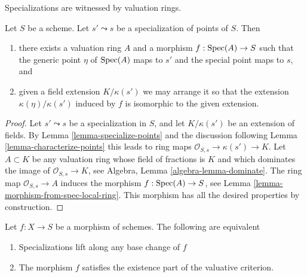 \begin{lemma}
\label{lemma-points-specialize}
\begin{slogan}
Specializations are witnessed by valuation rings.
\end{slogan}
Let $S$ be a scheme. Let $s' \leadsto s$ be a specialization of points of $S$.
Then
\begin{enumerate}
\item there exists a valuation ring $A$ and a morphism
$f : \mathop{\mathrm{Spec}}(A) \to S$ such that the generic point $\eta$ of
$\mathop{\mathrm{Spec}}(A)$ maps to $s'$ and the special point maps to $s$, and
\item given a field extension $K/\kappa(s')$
we may arrange it so that the extension
$\kappa(\eta)/\kappa(s')$ induced by $f$
is isomorphic to the given extension.
\end{enumerate}
\end{lemma}

\begin{proof}
Let $s' \leadsto s$ be a specialization in $S$, and let
$K/\kappa(s')$ be an extension of fields. By
Lemma \ref{lemma-specialize-points}
and the discussion following
Lemma \ref{lemma-characterize-points}
this leads to ring maps $\mathcal{O}_{S, s} \to \kappa(s') \to K$.
Let $A \subset K$ be any valuation ring whose field of fractions is
$K$ and which dominates the image of $\mathcal{O}_{S, s} \to K$, see
Algebra, Lemma \ref{algebra-lemma-dominate}.
The ring map $\mathcal{O}_{S, s} \to A$ induces the morphism
$f : \mathop{\mathrm{Spec}}(A) \to S$, see
Lemma \ref{lemma-morphism-from-spec-local-ring}.
This morphism has all the desired properties by construction.
\end{proof}

\begin{lemma}
\label{lemma-lift-specializations-valuative}
Let $f : X \to S$ be a morphism of schemes.
The following are equivalent
\begin{enumerate}
\item Specializations lift along any base change of $f$
\item The morphism $f$ satisfies the existence part of the
valuative criterion.
\end{enumerate}
\end{lemma}

